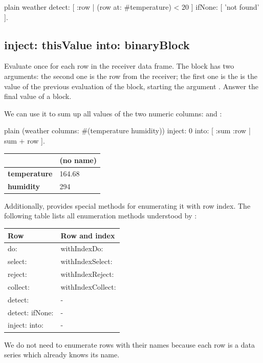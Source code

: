 \documentclass[10pt,twoside,english]{_support/latex/sbabook/sbabook}
\begin{document}
\begin{displaycode}{plain}
weather
  detect: [ :row | (row at: #temperature) < 20 ]
  ifNone: [ 'not found' ].
\end{displaycode}
\subsection{inject: thisValue into: binaryBlock}
Evaluate  once for each row in the receiver data frame. The block has two arguments: the second one is the row from the receiver; the first one is the is the value of the previous evaluation of the block, starting the argument . Answer the final value of a block.

We can use it to sum up all values of the two numeric columns:  and :

\begin{displaycode}{plain}
(weather columns: #(temperature humidity))
	inject: 0
	into: [ :sum :row | sum + row ].
\end{displaycode}

\begin{tabular}{ll}
\toprule
 & \textbf{(no name)} \\
\midrule
\textbf{temperature} & 164.68 \\
\textbf{humidity} & 294 \\
\bottomrule
\end{tabular}

Additionally,  provides special methods for enumerating it with row index. The following table lists all enumeration methods understood by :

\begin{tabular}{ll}
\toprule
\textbf{Row} & \textbf{Row and index} \\
\midrule
do: & withIndexDo: \\
select: & withIndexSelect: \\
reject: & withIndexReject: \\
collect: & withIndexCollect: \\
detect: & - \\
detect: ifNone: & - \\
inject: into: & - \\
\bottomrule
\end{tabular}

We do not need to enumerate rows with their names because each row is a data series which already knows its name.
\end{document}
